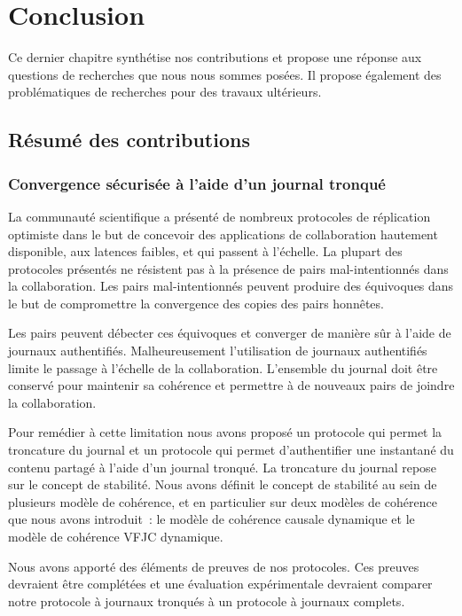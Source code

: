 
\chapter{Conclusion}\label{ch:conclusion}

\minitoc{}
\bigskip

Ce dernier chapitre synthétise nos contributions et propose une réponse aux questions de recherches que nous nous sommes posées.
Il propose également des problématiques de recherches pour des travaux ultérieurs.

\clearpage
\section{Résumé des contributions}

\subsection{Convergence sécurisée à l'aide d'un journal tronqué}

La communauté scientifique a présenté de nombreux protocoles de réplication optimiste dans le but de concevoir des applications de collaboration hautement disponible, aux latences faibles, et qui passent à l'échelle.
La plupart des protocoles présentés ne résistent pas à la présence de pairs mal-intentionnés dans la collaboration.
Les pairs mal-intentionnés peuvent produire des équivoques dans le but de compromettre la convergence des copies des pairs honnêtes.

Les pairs peuvent débecter ces équivoques et converger de manière sûr à l'aide de journaux authentifiés.
Malheureusement l'utilisation de journaux authentifiés limite le passage à l'échelle de la collaboration.
L'ensemble du journal doit être conservé pour maintenir sa cohérence et permettre à de nouveaux pairs de joindre la collaboration.

Pour remédier à cette limitation nous avons proposé un protocole qui permet la troncature du journal et un protocole qui permet d'authentifier une instantané du contenu partagé à l'aide d'un journal tronqué.
La troncature du journal repose sur le concept de stabilité.
Nous avons définit le concept de stabilité au sein de plusieurs modèle de cohérence, et en particulier sur deux modèles de cohérence que nous avons introduit~: le modèle de cohérence causale dynamique et le modèle de cohérence \acl{VFJC} dynamique.

Nous avons apporté des éléments de preuves de nos protocoles.
Ces preuves devraient être complétées et une évaluation expérimentale devraient comparer notre protocole à journaux tronqués à un protocole à journaux complets.


